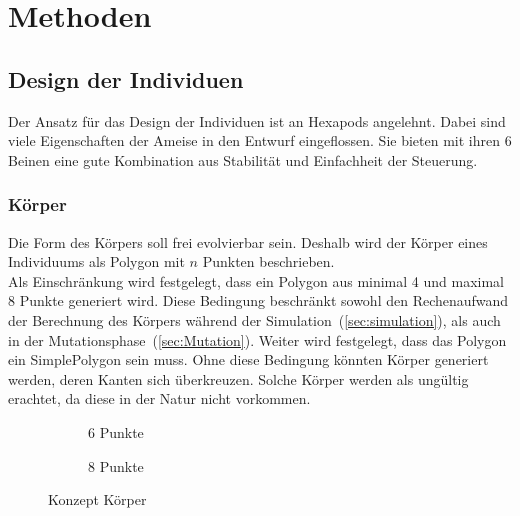 %
%


\chapter{Methoden\label{sec:method}}

  \section{Design der Individuen}

    Der Ansatz für das Design der Individuen ist an \Glspl{Hexapod} angelehnt.
    Dabei sind viele Eigenschaften der Ameise in den Entwurf eingeflossen.
    Sie bieten mit ihren 6 Beinen eine gute Kombination aus Stabilität und Einfachheit der Steuerung.

    \subsection{Körper\label{sub:DesignBody}}

      Die Form des Körpers soll frei evolvierbar sein.
      Deshalb wird der Körper eines Individuums als Polygon mit \(n\) Punkten beschrieben.
      \\
      Als Einschränkung wird festgelegt, dass ein Polygon aus minimal 4 und maximal 8 Punkte generiert wird.
      Diese Bedingung beschränkt sowohl den Rechenaufwand der Berechnung des Körpers während der Simulation~(\vref{sec:simulation}),
      als auch in der Mutationsphase~(\vref{sec:Mutation}).
      Weiter wird festgelegt, dass das Polygon ein \gls{SimplePolygon} sein muss.
      Ohne diese Bedingung könnten Körper generiert werden, deren Kanten sich überkreuzen.
      Solche Körper werden als ungültig erachtet, da diese in der Natur nicht vorkommen.

      \begin{figure}[H]
        \centering
        \begin{subfigure}[b]{0.3\textwidth}
          
          \caption{6 Punkte\label{fig:ConceptBodyPoints6}}
        \end{subfigure}
        \qquad
        \begin{subfigure}[b]{0.3\textwidth}
          
          \caption{8 Punkte\label{fig:ConceptBodyPoints8}}
        \end{subfigure}
        \caption{Konzept Körper\label{fig:ConceptBodyPoints}}
      \end{figure}

